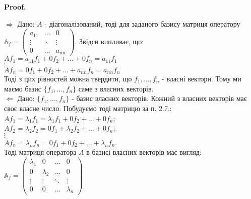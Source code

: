 \documentclass[a4paper, 10pt]{article}
\makeatletter
\def\qed{$\blacksquare$}
\def\rightproof{$\boxed{\Rightarrow}$ }
\def\leftproof{$\boxed{\Leftarrow}$ }
\theoremstyle{theoremdd}
\theoremstyle{theoremdd}
\theoremstyle{theoremdd}
\theoremstyle{theoremdd}
\theoremstyle{theoremdd}
\theoremstyle{theoremdd}
\theoremstyle{theoremdd}
\theoremstyle{theoremdd}
\renewenvironment{proof}[1][Proof.\\]{\par
\pushQED{\hfill \qed}%
\normalfont \topsep6\p@\@plus6\p@\relax
\trivlist
\item\relax
{\bfseries
#1\@addpunct{.}}\hspace\labelsep\ignorespaces
}{%
\popQED\endtrivlist\@endpefalse
}
\makeatother
\begin{document}
\begin{proof}
\rightproof Дано: $A$ - діагоналізований, тоді для заданого базису матриця оператору $\mathbb{A}_f = \begin{pmatrix}
a_{11} & \dots & 0 \\
\vdots & \ddots & \vdots \\
0 & \dots & a_{nn}
\end{pmatrix}$. Звідси випливає, що:\\
$Af_1 = a_{11}f_1 + 0f_2 + \dots + 0f_n = a_{11}f_1$\\
$\vdots$\\
$Af_n = 0f_1 + 0f_2 + \dots + a_{nn}f_n = a_{nn}f_n$\\
Тоді з цих рівностей можна твердити, що $f_1,\dots,f_n$ - власні вектори. Тому ми маємо базис $\{f_1,\dots,f_n\}$ саме з власних векторів.
\bigskip \\
\leftproof Дано: $\{f_1,\dots,f_n\}$ - базис власних векторів. Кожний з власних векторів має своє власне число. Побудуємо тоді матрицю за п. 2.7.:\\
$Af_1 = \lambda_1 f_1 = \lambda_1 f_1 + 0 f_2 + \dots + 0 f_n$;\\
$Af_2 = \lambda_2 f_2 = 0 f_1 + \lambda_2 f_2 + \dots + 0 f_n$;\\
$\vdots$\\
$Af_n = \lambda_n f_n = 0 f_1 + 0 f_2 + \dots + \lambda_n f_n$.\\
Тоді матриця оператора $A$ в базисі власних векторів має вигляд:\\
$\mathbb{A}_f = \begin{pmatrix}
\lambda_1 & 0 & \dots & 0 \\
0 & \lambda_2 & \dots & 0 \\
\vdots & \vdots & \ddots & \vdots \\
0 & 0 & \dots & \lambda_n
\end{pmatrix}$
\end{proof}
\end{document}
